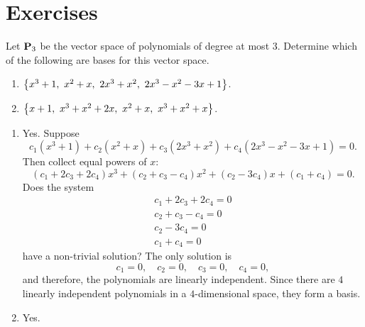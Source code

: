 \section*{Exercises}

\begin{ex}
  Let $\mathbf{P}_3$ be the vector space of polynomials of degree at most
  3. Determine which of the following are bases for this vector space.

  \begin{enumerate}
  \item $\left\{x^3+1,~x^2+x,~2x^3+x^2,~2x^3-x^2-3x+1\right\}$.
  \item $\left\{x+1,~x^3+x^2+2x,~x^2+x,~x^3+x^2+x\right\}$.
  \end{enumerate}

  \begin{sol}
    \begin{enumerate}
    \item
      Yes. Suppose
      \begin{equation*}
        c_{1}(x^3+1) +c_{2}(x^2+x) +c_{3}(
        2x^3+x^2) +c_{4}(2x^3-x^2-3x+1) =0.
      \end{equation*}
      Then collect equal powers of $x$:
      \begin{equation*}
        (c_{1}+2c_{3}+2c_{4}) x^3+(c_{2}+c_{3}-c_{4})
        x^2+(c_{2}-3c_{4}) x+(c_{1}+c_{4}) =0.
      \end{equation*}
      Does the system
      \begin{equation*}
        \begin{array}{c}
          c_{1}+2c_{3}+2c_{4}=0 \\
          c_{2}+c_{3}-c_{4}=0 \\
          c_{2}-3c_{4}=0 \\
          c_{1}+c_{4}=0
        \end{array}
      \end{equation*}
      have a non-trivial solution? The only solution is
      \begin{equation*}
        c_{1}=0,\quad
        c_{2}=0,\quad
        c_{3}=0,\quad
        c_{4}=0,
      \end{equation*}
      and therefore, the polynomials are linearly independent. Since
      there are $4$ linearly independent polynomials in a
      $4$-dimensional space, they form a basis.
    \item Yes.
    \end{enumerate}
  \end{sol}
\end{ex}

